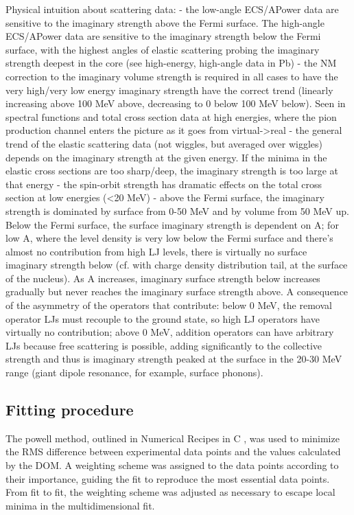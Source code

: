 Physical intuition about scattering data:
- the low-angle ECS/APower data are sensitive to the imaginary strength above
the Fermi surface. The high-angle ECS/APower data are sensitive to the imaginary
strength below the Fermi surface, with the highest angles of elastic scattering
probing the imaginary strength deepest in the core (see high-energy, high-angle
data in Pb)
- the NM correction to the imaginary volume strength is required in all cases to
have the very high/very low energy imaginary strength have the correct trend
(linearly increasing above 100 MeV above, decreasing to 0 below 100 MeV below).
Seen in spectral functions and total cross section data at high energies, where
the pion production channel enters the picture as it goes from virtual->real
- the general trend of the elastic scattering data (not wiggles, but averaged
over wiggles) depends on the imaginary strength at the given energy. If the
minima in the elastic cross sections are too sharp/deep, the imaginary strength
is too large at that energy
- the spin-orbit strength has dramatic effects on the total cross section at low
energies (<20 MeV)
- above the Fermi surface, the imaginary strength is dominated by surface from
0-50 MeV and by volume from 50 MeV up. Below the Fermi surface, the surface
imaginary strength is dependent on A; for low A, where the level density is very
low below the Fermi surface and there's almost no contribution from high LJ
levels, there is virtually no surface imaginary strength below (cf. with charge
density distribution tail, at the surface of the nucleus). As A increases, 
imaginary surface strength below increases gradually but never reaches the
imaginary surface strength above. A consequence of the asymmetry of the
operators that contribute: below 0 MeV, the removal operator LJs
must recouple to the ground state, so high LJ operators have virtually no
contribution; above 0 MeV, addition operators can have arbitrary LJs because
free scattering is possible, adding significantly to the collective strength and
thus is imaginary strength peaked at the surface in the 20-30 MeV range (giant
dipole resonance, for example, surface phonons).

\subsection{Fitting procedure}
The powell method, outlined in Numerical Recipes in C \cite{NumericalRecipes},
was used to minimize the RMS difference between experimental data points and the
values calculated by the DOM. A weighting scheme was assigned to the data points
according to their importance, guiding the fit to reproduce the most essential
data points. From fit to fit, the weighting scheme was adjusted as necessary to
escape local minima in the multidimensional fit.

